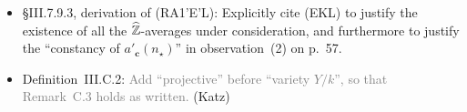 \documentclass[12pt]{article}
\begin{document}
\begin{itemize}
    (These changes are important for \S10, but not for \S9.)
    
    One could also remark that \emph{morally}, when applying (RA1) here (towards (RA1')) and elsewhere (via (RA1'), (RA1'E), and (RA1'E')),
    it suffices to work with boxes $\mcal{B}(\bm{Z})$ of \emph{intermediate} ``lopsidedness'' (say $\leq Z/Z^{1-\hbar} = Z^\hbar$),
    and with moduli $n_0$ and shifts $\abs{t}$ of \emph{small} size (say $\leq Z^{\hbar^2}$).
    
    \item \S{III.7.9.3}, derivation of (RA1’E’L):
    Explicitly cite (EKL) to justify the existence of all the $\widehat{\mathbb{Z}}$-averages under consideration,
    and furthermore to justify the ``constancy of $a'_{\bm{c}}(n_\star)$'' in observation~(2) on p.~57.
    
    \item Definition~III.C.2:
    \textcolor{gray}{Add ``projective'' before ``variety $Y/k$'',
    so that Remark~C.3 holds as written.}
    (Katz)
    
    
    
    

\end{itemize}
\end{document}
